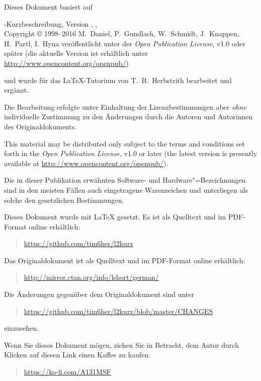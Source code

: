 {\parindent=0cm\thispagestyle{empty}

Dieses Dokument basiert auf
\bigskip

\sbLaTeXe-Kurzbeschreibung, Version \lkver, \lkdate,\\
Copyright \copyright{} 1998--2016 M.~Daniel, P.~Gundlach, W.~Schmidt, J.~Knappen, H.~Partl, I.~Hyna veröffentlicht unter der \emph{Open Publication License}, v1.0 oder später (die aktuelle Version ist erhältlich unter
\url{http://www.opencontent.org/openpub/})
\bigskip

und wurde für das \LaTeX-Tutorium von T.~B.~Herbstrith bearbeitet und ergänzt.

Die Bearbeitung erfolgte unter Einhaltung der Lizenzbestimmungen aber \emph{ohne} individuelle Zustimmung zu den Änderungen durch die Autoren und Autorinnen des Originaldokuments.
\bigskip

{
This material may be distributed only subject to the terms and
conditions set forth in the \emph{Open Publication License}, v1.0 or
later (the latest version is presently available at
\url{http://www.opencontent.org/openpub/}).}


\bigskip

Die in dieser Publikation erwähnten Software- und Hardware"=Bezeichnungen sind
in den meisten Fällen auch eingetragene Warenzeichen und unterliegen als
solche den gesetzlichen Bestimmungen.

\bigskip

\vfill

Dieses Dokument wurde mit \LaTeX{} gesetzt.
Es ist als Quelltext  und im 
PDF-Format online erhältlich:
\begin{quote}
\url{https://github.com/tim6her/l2kurz}
\end{quote}

\bigskip

Das Originaldokument ist als Quelltext und im PDF-Format online erhältlich:
\begin{quote}
\url{http://mirror.ctan.org/info/lshort/german/}
\end{quote}
Die Änderungen gegenüber dem Originaldokument sind unter
\begin{quote}
\url{https://github.com/tim6her/l2kurz/blob/master/CHANGES}
\end{quote}
einzusehen.

\bigskip

Wenn Sie dieses Dokument mögen, ziehen Sie in Betracht, dem Autor durch Klicken auf diesen Link einen Kaffee zu kaufen:
\begin{quote}
\url{https://ko-fi.com/A131MSF}
\end{quote}
}
